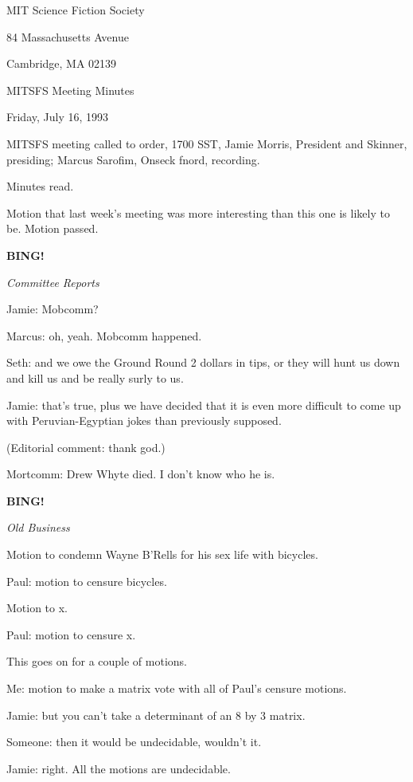 \documentclass[12pt]{article}
\newcommand{\bing}{{\bf BING!} }
\newcommand{\goto}[1]{\bing \vskip 12pt \centerline{{\em{#1}}}}
\begin{document}
\begin{center}

MIT Science Fiction Society 

84 Massachusetts Avenue

Cambridge, MA 02139

\vspace{12pt}

MITSFS Meeting Minutes 

Friday, July 16, 1993

\end{center}
 
\vspace{18pt}

\setlength{\parskip}{6pt}

\noindent
MITSFS meeting called to order, 1700 SST,
Jamie Morris, President and Skinner, presiding; Marcus Sarofim, Onseck fnord, recording.

Minutes read.

Motion that last week's meeting was more interesting than this one is likely to be. Motion passed.

\goto{Committee Reports}

Jamie: Mobcomm?

Marcus: oh, yeah. Mobcomm happened.

Seth: and we owe the Ground Round 2 dollars in tips, or they will hunt us down and kill us and be really surly to us.

Jamie: that's true, plus we have decided that it is even more difficult to come up with Peruvian-Egyptian jokes than previously supposed.

(Editorial comment: thank god.)

Mortcomm: Drew Whyte died. I don't know who he is.

\goto{Old Business}

Motion to condemn Wayne B'Rells for his sex life with bicycles.

Paul: motion to censure bicycles.

Motion to x.

Paul: motion to censure x.

This goes on for a couple of motions.

Me: motion to make a matrix vote with all of Paul's censure motions.

Jamie: but you can't take a determinant of an 8 by 3 matrix.

Someone: then it would be undecidable, wouldn't it.

Jamie: right. All the motions are undecidable.
\end{document}
